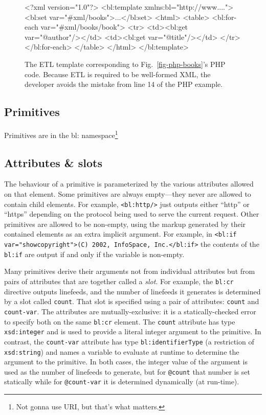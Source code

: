 \documentclass{www2003-submission}
\newcommand{\smtexttt}[1]{{\small\texttt{#1}}}
\newcommand{\figref}[1]{Fig.~\ref{fig-#1}}
\begin{document}
\begin{figure}[htbp]
\begin{listing}{1}
<?xml version="1.0"?>
<bl:template xmlns:bl="http://www....">
 <bl:set var="#xml/books">...</bl:set>
 <html>
  <table>
   <bl:for-each var="#xml/books/book">
    <tr> 
     <td><bl:get var="@author"/></td>
     <td><bl:get var="@title"/></td>
    </tr>
   </bl:for-each>
  </table>
 </html>
</bl:template>
\end{listing}%
\caption{The ETL template corresponding to \figref{php-books}'s PHP
code. Because ETL is required to be well-formed XML, the developer
avoids the mistake from line 14 of the PHP example.
\label{fig-etl-books}}
\end{figure}

\subsection{Primitives}

Primitives are in the bl: namespace\footnote{Not gonna use URI, but that's what matters.}

\subsection{Attributes \& slots}

The behaviour of a primitive is parameterized by the various
attributes allowed on that element.  Some primitives are always
empty---they never are allowed to contain child elements.  For example,
\smtexttt{<bl:http/>} just outputs either ``http'' or ``https''
depending on the protocol being used to serve the current request.
Other primitives are allowed to be non-empty, using the markup generated
by their contained elements as an extra implicit argument.  For example,
in \smtexttt{<bl:if var="showcopyright">(C) 2002, InfoSpace,
  Inc.</bl:if>} the contents of the \smtexttt{bl:if} are output if and
only if the variable is non-empty.

Many primitives derive their arguments not from individual attributes
but from pairs of attributes that are together called a \emph{slot}.  For
example, the \smtexttt{bl:cr} directive outputs linefeeds, and the
number of linefeeds it generates is determined by a slot called
\smtexttt{count}.  That slot is specified using a pair of attributes:
\smtexttt{count} and \smtexttt{count-var}.  The attributes are
mutually-exclusive: it is a statically-checked error to specify both on
the same \smtexttt{bl:cr} element.  The \smtexttt{count} attribute has
type \smtexttt{xsd:integer} and is used to provide a literal integer
argument to the primitive.  In contrast, the \smtexttt{count-var}
attribute has type \smtexttt{bl:identifierType} (a restriction of
\smtexttt{xsd:string}) and names a variable to evaluate at runtime to
determine the argument to the primitive.  In both cases, the integer
value of the argument is used as the number of linefeeds to generate,
but for \smtexttt{@count} that number is set statically while for
\smtexttt{@count-var} it is determined dynamically (at run-time).
\end{document}
